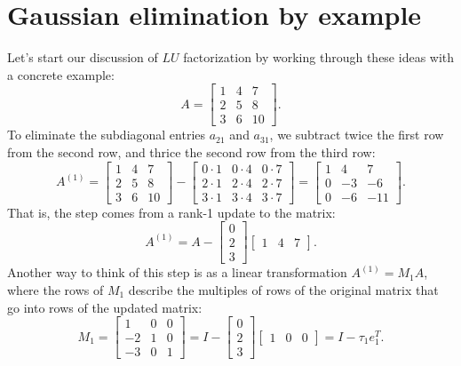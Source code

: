 \section{Gaussian elimination by example}

Let's start our discussion of $LU$ factorization by working through
these ideas with a concrete example:
\[
  A =
  \begin{bmatrix}
    1 & 4 & 7 \\
    2 & 5 & 8 \\
    3 & 6 & 10
  \end{bmatrix}.
\]
To eliminate the subdiagonal entries $a_{21}$ and $a_{31}$, we
subtract twice the first row from the second row, and thrice the
second row from the third row:
\[
  A^{(1)} =
  \begin{bmatrix}
    1 & 4 & 7 \\
    2 & 5 & 8 \\
    3 & 6 & 10
  \end{bmatrix} -
  \begin{bmatrix}
    0 \cdot 1 & 0 \cdot 4 & 0 \cdot 7 \\
    2 \cdot 1 & 2 \cdot 4 & 2 \cdot 7 \\
    3 \cdot 1 & 3 \cdot 4 & 3 \cdot 7
  \end{bmatrix}
  =
  \begin{bmatrix}
    1 &  4 &  7 \\
    0 & -3 & -6 \\
    0 & -6 & -11
  \end{bmatrix}.
\]
That is, the step comes from a rank-1 update to the matrix:
\[
  A^{(1)} =
  A -
  \begin{bmatrix} 0 \\ 2 \\ 3 \end{bmatrix}
  \begin{bmatrix} 1 & 4 & 7 \end{bmatrix}.
\]
Another way to think of this step is as a linear transformation
$A^{(1)} = M_1 A$, where the rows of $M_1$ describe the multiples
of rows of the original matrix that go into rows of the updated matrix:
\[
  M_1 = \begin{bmatrix} 1 & 0 & 0 \\ -2 & 1 & 0 \\ -3 & 0 & 1 \end{bmatrix}
      = I - \begin{bmatrix} 0 \\ 2 \\ 3 \end{bmatrix}
            \begin{bmatrix} 1 & 0 & 0 \end{bmatrix}
      = I - \tau_1 e_1^T.
\]
